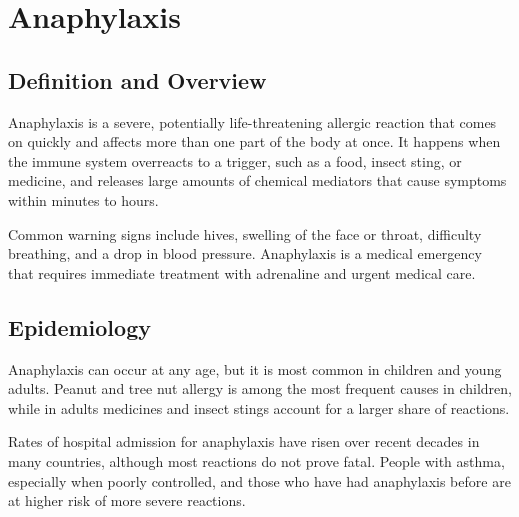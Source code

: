 \chapter{Anaphylaxis}

\section*{Definition and Overview}
Anaphylaxis is a severe, potentially life-threatening allergic reaction that comes on quickly and affects more than one part of the body at once. It happens when the immune system overreacts to a trigger, such as a food, insect sting, or medicine, and releases large amounts of chemical mediators that cause symptoms within minutes to hours.

Common warning signs include hives, swelling of the face or throat, difficulty breathing, and a drop in blood pressure. Anaphylaxis is a medical emergency that requires immediate treatment with adrenaline and urgent medical care.

\section*{Epidemiology}
Anaphylaxis can occur at any age, but it is most common in children and young adults. Peanut and tree nut allergy is among the most frequent causes in children, while in adults medicines and insect stings account for a larger share of reactions.

Rates of hospital admission for anaphylaxis have risen over recent decades in many countries, although most reactions do not prove fatal. People with asthma, especially when poorly controlled, and those who have had anaphylaxis before are at higher risk of more severe reactions.

